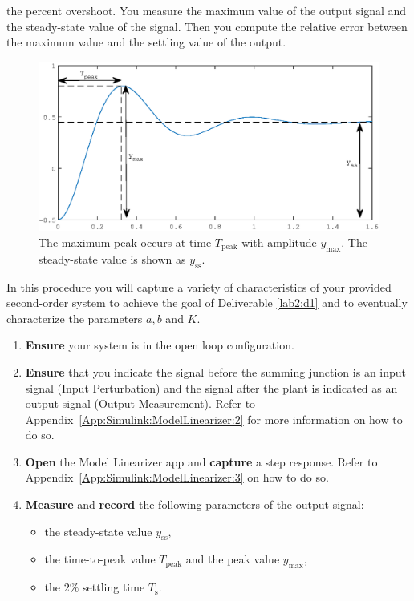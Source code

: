 the percent overshoot. You measure the maximum value of the output
signal and the steady-state value of the signal. Then you
compute the relative error between the maximum value and the settling value of
the output.
%
\begin{figure}
  \includegraphics{images/Lab_2_Peak.eps}
  \caption[Depicting Overshoot Measurements for a Second-Order System.]{%
    The maximum peak occurs at time \(T_\mathrm{peak}\) with amplitude
    \(y_\mathrm{max}.\) The steady-state value is shown as \(y_{\mathrm{ss}}.\)
  }
  \label{fig:lab2:peak}
\end{figure}
%
\begin{procedure}[label={proc:lab2:p1}]
  In this procedure you will capture a variety of characteristics of
  your provided second-order system to achieve the goal of Deliverable
  \ref{lab2:d1} and to eventually characterize the parameters \(a,\)\(b\)
  and \(K.\)
  \begin{enumerate}[label=(\arabic*)]
    \item{
      \textbf{Ensure} your system is in the open loop configuration.
    }
    \item{
      \textbf{Ensure} that you indicate the signal before the summing junction
      is an input signal (Input Perturbation) and the signal after the plant
      is indicated as an output signal (Output Measurement). Refer
      to Appendix~\ref{App:Simulink:ModelLinearizer:2} for more information
      on how to do so.
    }
    \item{
      \textbf{Open} the Model Linearizer app and \textbf{capture} a
      step response. Refer to Appendix~\ref{App:Simulink:ModelLinearizer:3}
      on how to do so.
    }
    \item{
      \textbf{Measure} and \textbf{record} the following parameters of the
      output signal:
      \begin{itemize}
        \item{
          the steady-state value \(y_{\mathrm{ss}},\)
        }
        \item{
          the time-to-peak value \(T_{\mathrm{peak}}\) and
          the peak value \(y_{\mathrm{max}},\)
        }
        \item{
          the \(2\%\) settling time \(T_{\mathrm{s}}.\)
        }
      \end{itemize}
      \label{proc:lab2:p1:4}
    }
  \end{enumerate}
\end{procedure}


